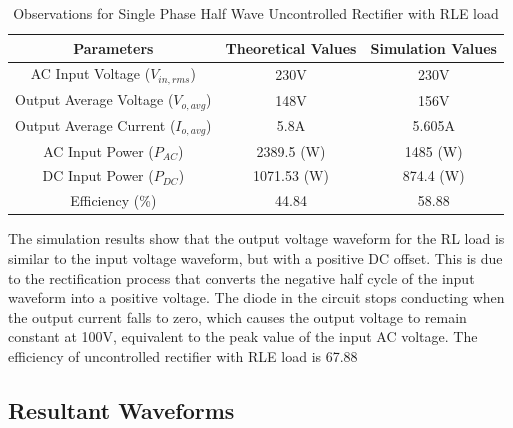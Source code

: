 \begin{table}[h]
    \renewcommand{\arraystretch}{1.3}

    \label{table_observation_single-phase-half-wave-uncontrolled-rectifier-with-RLE-load}
    \centering
    \begin{tabular}{|c|c|c|}
        \hline
        Parameters                              & Theoretical Values & Simulation Values \\
        \hline
        \hline
        AC Input Voltage ($ V_{in,rms} $)       & 230V               & 230V              \\
        \hline
        Output Average Voltage ($ V_{o,avg} $)  & 148V               & 156V            \\
        \hline
        Output Average Current ($ I_{o,avg}  $) & 5.8A               & 5.605A            \\
        \hline
        AC Input Power ($ P_{AC}  $)            & 2389.5 (W)         & 1485 (W)          \\
        \hline
        DC Input Power ($ P_{DC}  $)            & 1071.53 (W)        & 874.4 (W)         \\
        \hline
        Efficiency (\%)                         & 44.84              & 58.88             \\
        \hline
    \end{tabular}
    \caption{Observations for Single Phase Half Wave Uncontrolled Rectifier with RLE load}
\end{table}


The simulation results show that the output voltage waveform for the RL load is similar to the input voltage waveform, but with a positive DC offset. This is due to the rectification process that converts the negative half cycle of the input waveform into a positive voltage. The diode in the circuit stops conducting when the output current falls to zero, which causes the output voltage to remain constant at 100V, equivalent to the peak value of the input AC voltage.
The efficiency of uncontrolled rectifier with RLE load is 67.88%

\pagebreak

\subsection{Resultant Waveforms}


